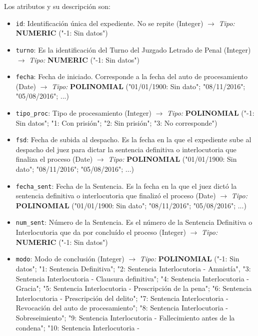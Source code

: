 \documentclass[11pt]{article}
\providecommand{\tightlist}{%
      \setlength{\itemsep}{0pt}\setlength{\parskip}{0pt}}
\begin{document}
Los atributos y su descripción son:

\begin{itemize}
\tightlist
\item
  \texttt{id}: Identificación única del expediente. No se repite
  (Integer) \(\rightarrow\) \emph{Tipo:} {\textbf{NUMERIC} ("-1: Sin
  datos")}
\item
  \texttt{turno}: Es la identificación del Turno del Juzgado Letrado de
  Penal (Integer) \(\rightarrow\) \emph{Tipo:} {\textbf{NUMERIC} ("-1:
  Sin datos")}
\item
  \texttt{fecha}: Fecha de iniciado. Corresponde a la fecha del auto de
  procesamiento (Date) \(\rightarrow\) \emph{Tipo:} {\textbf{POLINOMIAL}
  ("01/01/1900: Sin dato"; "08/11/2016"; "05/08/2016"; ...)}
\item
  \texttt{tipo\_proc}: Tipo de procesamiento (Integer) \(\rightarrow\)
  \emph{Tipo:} {\textbf{POLINOMIAL} ("-1: Sin datos"; "1: Con prisión";
  "2: Sin prisión"; "3: No corresponde")}
\item
  \texttt{fsd}: Fecha de subida al despacho. Es la fecha en la que el
  expediente sube al despacho del juez para dictar la sentencia
  definitiva o interlocutoria que finaliza el proceso (Date)
  \(\rightarrow\) \emph{Tipo:} {\textbf{POLINOMIAL} ("01/01/1900: Sin
  dato"; "08/11/2016"; "05/08/2016"; ...)}
\item
  \texttt{fecha\_sent}: Fecha de la Sentencia. Es la fecha en la que el
  juez dictó la sentencia definitiva o interlocutoria que finalizó el
  proceso (Date) \(\rightarrow\) \emph{Tipo:} {\textbf{POLINOMIAL}
  ("01/01/1900: Sin dato"; "08/11/2016"; "05/08/2016"; ...)}
\item
  \texttt{num\_sent}: Número de la Sentencia. Es el número de la
  Sentencia Definitiva o Interlocutoria que da por concluído el proceso
  (Integer) \(\rightarrow\) \emph{Tipo:} {\textbf{NUMERIC} ("-1: Sin
  datos")}
\item
  \texttt{modo}: Modo de conclusión (Integer) \(\rightarrow\)
  \emph{Tipo:} {\textbf{POLINOMIAL} ("-1: Sin datos"; "1: Sentencia
  Definitiva"; "2: Sentencia Interlocutoria - Amnistía", "3: Sentencia
  Interlocutoria - Clausura definitiva"; "4: Sentencia Interlocutoria -
  Gracia"; "5: Sentencia Interlocutoria - Prescripción de la pena"; "6:
  Sentencia Interlocutoria - Prescripción del delito"; "7: Sentencia
  Interlocutoria - Revocación del auto de procesamiento"; "8: Sentencia
  Interlocutoria - Sobreseimiento"; "9: Sentencia Interlocutoria -
  Fallecimiento antes de la condena"; "10: Sentencia Interlocutoria -
}
\end{itemize}
\end{document}
